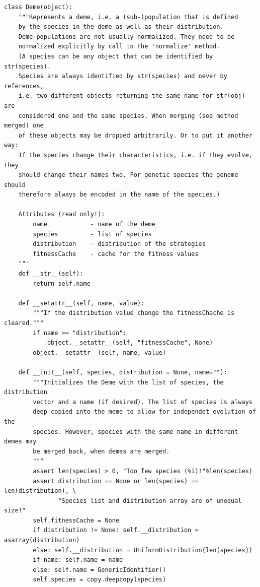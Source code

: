 \begin{scriptsize}
\begin{verbatim}
class Deme(object):
    """Represents a deme, i.e. a (sub-)population that is defined
    by the species in the deme as well as their distribution.
    Deme populations are not usually normalized. They need to be
    normalized explicitly by call to the 'normalize' method.
    (A species can be any object that can be identified by str(species).
    Species are always identified by str(species) and never by references,
    i.e. two different objects returning the same name for str(obj) are
    considered one and the same species. When merging (see method merged) one
    of these objects may be dropped arbitrarily. Or to put it another way:
    If the species change their characteristics, i.e. if they evolve, they
    should change their names two. For genetic species the genome should
    therefore always be encoded in the name of the species.)

    Attributes (read only!):
        name            - name of the deme
        species         - list of species
        distribution    - distribution of the strategies
        fitnessCache    - cache for the fitness values
    """
    def __str__(self):
        return self.name

    def __setattr__(self, name, value):
        """If the distribution value change the fitnessChache is cleared."""
        if name == "distribution":
            object.__setattr__(self, "fitnessCache", None)
        object.__setattr__(self, name, value)

    def __init__(self, species, distribution = None, name=""):
        """Initializes the Deme with the list of species, the distribution
        vector and a name (if desired). The list of species is always
        deep-copied into the meme to allow for independet evolution of the
        species. However, species with the same name in different demes may
        be merged back, when demes are merged.
        """
        assert len(species) > 0, "Too few species (%i)!"%len(species)
        assert distribution == None or len(species) == len(distribution), \
               "Species list and distribution array are of unequal size!"
        self.fitnessCache = None     
        if distribution != None: self.__distribution = asarray(distribution)
        else: self.__distribution = UniformDistribution(len(species))
        if name: self.name = name
        else: self.name = GenericIdentifier()
        self.species = copy.deepcopy(species)


\end{verbatim}
\end{scriptsize}
